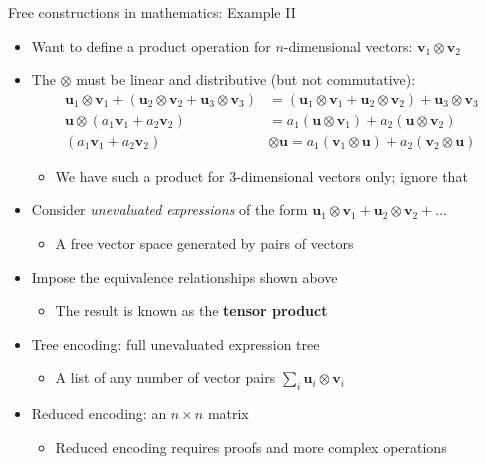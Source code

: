 \documentclass[english,,russian]{beamer}
\begin{document}
\begin{frame}{Free constructions in mathematics: Example II}
\begin{itemize}
\item Want to define a product operation for $n$-dimensional vectors: $\mathbf{v}_{1}\otimes\mathbf{v}_{2}$
\item The $\otimes$ must be linear and distributive (but not commutative):
\begin{align*}
\mathbf{u}_{1}\otimes\mathbf{v}_{1}+\left(\mathbf{u}_{2}\otimes\mathbf{v}_{2}+\mathbf{u}_{3}\otimes\mathbf{v}_{3}\right) & =\left(\mathbf{u}_{1}\otimes\mathbf{v}_{1}+\mathbf{u}_{2}\otimes\mathbf{v}_{2}\right)+\mathbf{u}_{3}\otimes\mathbf{v}_{3}\\
\mathbf{u}\otimes\left(a_{1}\mathbf{v}_{1}+a_{2}\mathbf{v}_{2}\right) & =a_{1}\left(\mathbf{u}\otimes\mathbf{v}_{1}\right)+a_{2}\left(\mathbf{u}\otimes\mathbf{v}_{2}\right)\\
\left(a_{1}\mathbf{v}_{1}+a_{2}\mathbf{v}_{2}\right) & \otimes\mathbf{u}=a_{1}\left(\mathbf{v}_{1}\otimes\mathbf{u}\right)+a_{2}\left(\mathbf{v}_{2}\otimes\mathbf{u}\right)
\end{align*}

\begin{itemize}
\item We have such a product for 3-dimensional vectors only; ignore that
\end{itemize}
\item Consider \emph{unevaluated} \emph{expressions} of the form $\mathbf{u}_{1}\otimes\mathbf{v}_{1}+\mathbf{u}_{2}\otimes\mathbf{v}_{2}+...$
\begin{itemize}
\item A free vector space generated by pairs of vectors
\end{itemize}
\item Impose the equivalence relationships shown above
\begin{itemize}
\item The result is known as the \textbf{tensor product}
\end{itemize}
\item Tree encoding: full unevaluated expression tree
\begin{itemize}
\item A list of any number of vector pairs $\sum_{i}\mathbf{u}_{i}\otimes\mathbf{v}_{i}$
\end{itemize}
\item Reduced encoding: an $n\times n$ matrix
\begin{itemize}
\item Reduced encoding requires proofs and more complex operations
\end{itemize}
\end{itemize}
\end{frame}
\end{document}
